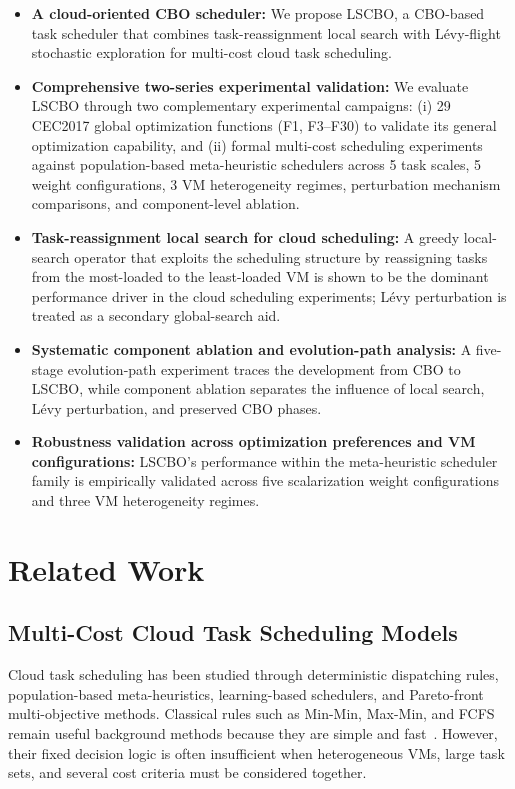 \documentclass[pdflatex,onecolumn,sn-mathphys-num]{sn-jnl}
\begin{document}
\begin{itemize}
    \item \textbf{A cloud-oriented CBO scheduler:} We propose LSCBO, a CBO-based task scheduler that combines task-reassignment local search with L\'{e}vy-flight stochastic exploration for multi-cost cloud task scheduling.
    
    \item \textbf{Comprehensive two-series experimental validation:} We evaluate LSCBO through two complementary experimental campaigns: (i) 29 CEC2017 global optimization functions (F1, F3--F30) to validate its general optimization capability, and (ii) formal multi-cost scheduling experiments against population-based meta-heuristic schedulers across 5 task scales, 5 weight configurations, 3 VM heterogeneity regimes, perturbation mechanism comparisons, and component-level ablation.
    
    \item \textbf{Task-reassignment local search for cloud scheduling:} A greedy local-search operator that exploits the scheduling structure by reassigning tasks from the most-loaded to the least-loaded VM is shown to be the dominant performance driver in the cloud scheduling experiments; L\'{e}vy perturbation is treated as a secondary global-search aid.
    
    \item \textbf{Systematic component ablation and evolution-path analysis:} A five-stage evolution-path experiment traces the development from CBO to LSCBO, while component ablation separates the influence of local search, L\'{e}vy perturbation, and preserved CBO phases.
    
    \item \textbf{Robustness validation across optimization preferences and VM configurations:} LSCBO's performance within the meta-heuristic scheduler family is empirically validated across five scalarization weight configurations and three VM heterogeneity regimes.
\end{itemize}

\section{Related Work}\label{sec2}

\subsection{Multi-Cost Cloud Task Scheduling Models}
Cloud task scheduling has been studied through deterministic dispatching rules, population-based meta-heuristics, learning-based schedulers, and Pareto-front multi-objective methods. Classical rules such as Min-Min, Max-Min, and FCFS remain useful background methods because they are simple and fast~\cite{Braun2001,Etminani2007}. However, their fixed decision logic is often insufficient when heterogeneous VMs, large task sets, and several cost criteria must be considered together.
\end{document}
